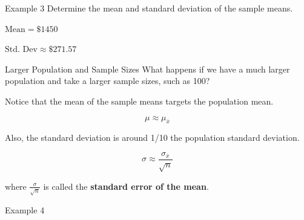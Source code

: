 \documentclass[t]{beamer}
\begin{document}
\begin{frame}{Example 3}
Determine the mean and standard deviation of the sample means.	\newline\\	\pause

$\text{Mean} = \$1450$ \newline\\	\pause

$\text{Std. Dev} \approx \$271.57$
\end{frame}

\begin{frame}{Larger Population and Sample Sizes}
What happens if we have a much larger population and take a larger sample sizes, such as 100?	\newline\\	\pause

Notice that the mean of the sample means targets the population mean. 	\pause

\[\mu \approx \mu_{\overline{x}}\]		\pause

Also, the standard deviation is around 1/10 the population standard deviation. 	\pause

\[\sigma \approx \frac{\sigma_{\overline{x}}}{\sqrt{n}}\]

where $\frac{\sigma}{\sqrt{n}}$ is called the {\color{blue}\textbf{standard error of the mean}}.
\end{frame}

\begin{frame}{Example 4}

\end{frame}
\end{document}
